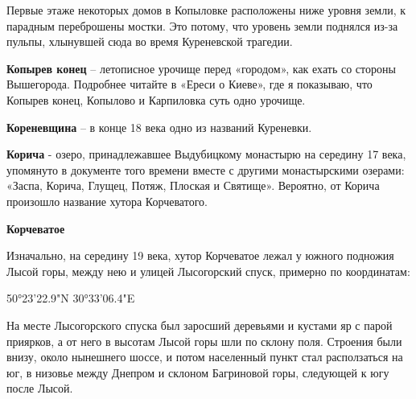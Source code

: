 Первые этаже некоторых домов в Копыловке расположены ниже уровня земли, к парадным переброшены мостки. Это потому, что уровень земли поднялся из-за пульпы, хлынувшей сюда во время Куреневской трагедии.\\

\medskip

\textbf{Копырев конец} – летописное урочище перед «городом», как ехать со стороны Вышегорода. Подробнее читайте в «Ереси о Киеве», где я показываю, что Копырев конец, Копылово и Карпиловка суть одно урочище.\\

\medskip



\textbf{Кореневщина} – в конце 18 века одно из названий Куреневки.\\

\medskip


\textbf{Корича} - озеро, принадлежавшее Выдубицкому монастырю на середину 17 века, упомянуто в документе того времени вместе с другими монастырскими озерами: «Заспа, Корича, Глущец, Потяж, Плоская и Святище». Вероятно, от Корича произошло название хутора Корчеватого.\\

\medskip


\textbf{Корчеватое} 

Изначально, на середину 19 века, хутор Корчеватое лежал у южного подножия Лысой горы, между нею и улицей Лысогорский спуск, примерно по координатам:

50°23'22.9"N 30°33'06.4"E

На месте Лысогорского спуска был заросший деревьями и кустами яр с парой приярков, а от него в высотам Лысой горы шли по склону поля. Строения были внизу, около нынешнего 
шоссе, и потом населенный пункт стал расползаться на юг, в низовье между Днепром и склоном Багриновой горы, следующей к югу после Лысой.\\

